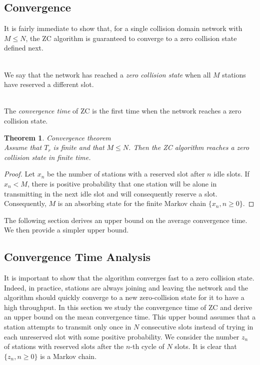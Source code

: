 \documentclass{acm_proc_article-sp}
\newtheorem{theorem}{Theorem}
\newcommand{\rt}{$T_{r}$\xspace}
\newcommand{\m}{$M$\xspace}
\begin{document}
\subsection{Convergence}
It is fairly immediate to show that, for a single collision domain network with $M \leq N$,  the ZC algorithm is guaranteed to converge  to a zero collision state defined next.

\\
We say that the network has reached a {\em zero collision state} when all $M$ stations have reserved a different slot.

\\
The {\em convergence time} of ZC is the first time when the network reaches a zero collision state.

\begin{theorem}{Convergence theorem}\\
Assume that \rt is finite and that \m $\leq N$. Then the ZC algorithm reaches a zero collision state in finite time.
\end{theorem}

\begin{proof}
Let $x_n$ be the number of stations with a reserved slot after $n$ idle slots.  If $x_n < M$, there is positive probability that one station will be alone in transmitting in the next idle slot and will consequently reserve a slot.  Consequently, $M$ is an absorbing state for the finite Markov chain $\{x_n, n \geq 0\}$.
\end{proof}


The following section derives an upper bound on the average convergence time. We then provide a simpler upper bound.

\subsection{Convergence Time Analysis}
It is important to show that the algorithm converges fast to a zero collision state.  Indeed, in practice, stations are always joining and leaving the network and the algorithm should quickly converge to a new zero-collision state for it to have a high throughput. In this section we study the convergence time of ZC and derive an upper bound on the mean convergence time. This upper bound assumes that a station attempts to transmit only once in $N$ consecutive slots instead of trying in each unreserved slot with some positive probability.  We consider the number $z_n$ of stations with reserved slots after the $n$-th cycle of $N$ slots.  It is clear that $\{z_n, n \geq 0\}$ is a Markov chain.
\end{document}
